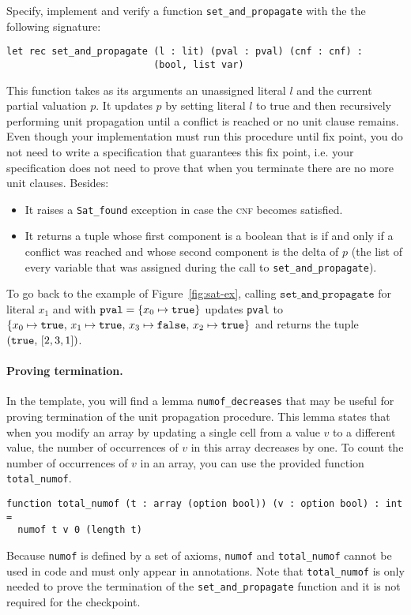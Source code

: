\documentclass[11pt]{article}
\begin{document}
\begin{task}[40 pts]
Specify, implement and verify a function \verb|set_and_propagate| with the 
the following signature:

\begin{lstlisting}
let rec set_and_propagate (l : lit) (pval : pval) (cnf : cnf) : 
                          (bool, list var)
\end{lstlisting}

This function takes as its arguments an unassigned literal $l$ and the current partial
valuation $p$. It updates $p$ by
setting literal $l$ to true and then recursively performing unit propagation until a 
conflict is reached or no unit clause remains.
%
Even though your implementation must run this procedure until fix point, you do not need to write a 
specification that guarantees this fix point, i.e. your specification does not need to prove that 
when you terminate there are no more unit clauses.
%
Besides:

\begin{itemize}
\item It raises a \verb|Sat_found| exception in case the \textsc{cnf} becomes satisfied.
\item It returns a tuple whose first component is a boolean that is \true{} if and only if a conflict was reached and whose second component is the delta of $p$ (the list of every variable that was assigned during the call to \verb|set_and_propagate|).
\end{itemize}

\noindent To go back to the example of Figure~\ref{fig:sat-ex}, calling 
$\texttt{set\_and\_propagate}$ for literal $x_1$ and with $\texttt{pval} = \{ x_0 \mapsto \texttt{true} \}$
updates \verb|pval| to $\{x_0 \mapsto \texttt{true},\, x_1 \mapsto \texttt{true},\, x_3 \mapsto \texttt{false},\, x_2 \mapsto \texttt{true} \}$ and returns the tuple $(\texttt{true},\, [2, 3, 1])$.

\paragraph{Proving termination.} In the template, you will find a lemma \texttt{numof\_decreases} that may be useful for proving termination of the unit propagation procedure. This lemma states that when you modify an array by updating a single cell from a value $v$ to a {different} value, the number of occurrences of $v$ in this array decreases by one. 
%
To count the number of occurrences of $v$ in an array, you can use the provided function \texttt{total\_numof}. 

\begin{lstlisting}
function total_numof (t : array (option bool)) (v : option bool) : int =
  numof t v 0 (length t)
\end{lstlisting}

Because \texttt{numof} is defined by a set of axioms,
\texttt{numof} and \verb|total_numof| cannot be used in code and must only appear in annotations.
%
Note that \verb|total_numof| is only needed to prove the termination of the \texttt{set\_and\_propagate} function and it is not required for the checkpoint.
\end{task}
\end{document}

